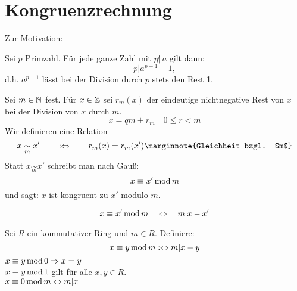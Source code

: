 \section{Kongruenzrechnung}
\label{sec:para3}
	Zur Motivation:
	
\begin{satz} \label{satz_3.1}
	Sei $p$ Primzahl. Für jede ganze Zahl mit $p \not | \ a$ gilt dann:
	\[ p | a^{p-1} - 1, \]
	d.h. $a^{p-1}$ lässt bei der Division durch $p$ stets den Rest 1. 
\end{satz}

\begin{defn}[Kongruenz in $\ZZ$] \label{def_3.1}
	Sei $m \in \mathbb{N}$ fest. Für $x\in \mathbb{Z}$ sei $r_m(x)$ der eindeutige nichtnegative Rest von $x$ bei der Division von $x$ durch $m$. 
	\[ x = qm + r_m \quad 0 \leq r < m \]
	Wir definieren eine Relation
	\[ x \underset{m}{\sim} x' \qquad :\Leftrightarrow \qquad r_m(x) = r_m(x') \marginnote{Gleichheit bzgl. $m$}\]
	Statt $x \underset{m}{\sim} x'$ schreibt man nach Gauß:
	\[ x \equiv x' \operatorname{mod} m \]
	und sagt: $x$ ist kongruent zu $x'$ modulo $m$. 
\end{defn}

\begin{falko} \label{F3.1} 
	\[ x \equiv x' \operatorname{mod} m \quad \Leftrightarrow \quad m | x-x' \]	
\end{falko}

\setcounter{countdef}{0}
\begin{defn} \label{def_3.1a}
	Sei $R$ ein kommutativer Ring und $m \in R$. Definiere:
	\[ x \equiv y \operatorname{mod} m :\Leftrightarrow m | x-y \]
	$x \equiv y \operatorname{mod} 0 \Rightarrow x=y$ \\
	$x \equiv y \operatorname{mod} 1$ gilt für alle $x,y \in R$. \\
	$x \equiv 0 \operatorname{mod} m \Leftrightarrow m | x$
\end{defn}

